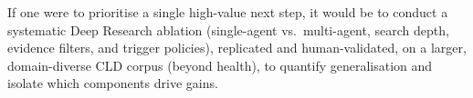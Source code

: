 If one were to prioritise a single high-value next step, it would be to conduct a systematic Deep Research ablation (single-agent vs.\ multi-agent, search depth, evidence filters, and trigger policies), replicated and human-validated, on a larger, domain-diverse CLD corpus (beyond health), to quantify generalisation and isolate which components drive gains.
